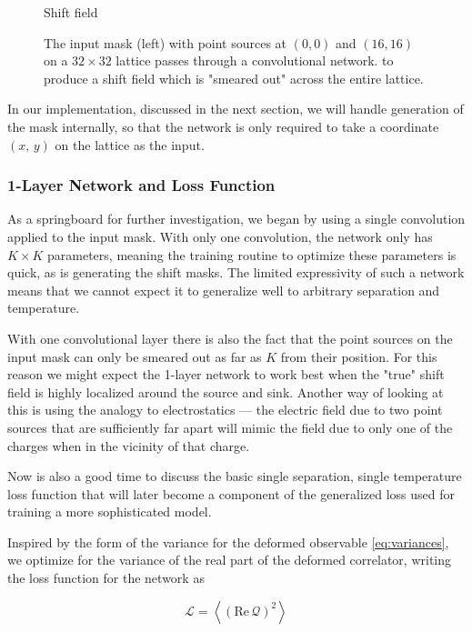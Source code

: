 \documentclass[12pt]{article}
\begin{document}
\begin{figure}[h]
\begin{minipage}{0.3\textwidth}
		\caption*{Shift field}
	\end{minipage}
	\caption{The input mask (left) with point sources at $(0,0)$ and $(16,16)$ on a $32\times 32$ lattice passes through a convolutional network. 
	to produce a shift field which is "smeared out" across the entire lattice.}
	\label{fig:mask_to_shift}
\end{figure}

In our implementation, discussed in the next section, we will handle generation of the mask internally, so that the network is only required to
take a coordinate $(x,\,y)$ on the lattice as the input. 

\subsubsection{1-Layer Network and Loss Function}

As a springboard for further investigation, we began by using a single convolution applied to the input mask. With only one convolution, the network
only has $K\times K$ parameters, meaning the training routine to optimize these parameters is quick, as is generating the shift masks. The limited
expressivity of such a network means that we cannot expect it to generalize well to arbitrary separation and temperature.

With one convolutional layer there is also the fact that the point sources on the input mask can only be smeared out as far as $K$ from their position.
For this reason we might expect the 1-layer network to work best when the "true" shift field is highly localized around the source and sink. Another way
of looking at this is using the analogy to electrostatics --- the electric field due to two point sources that are sufficiently far apart will mimic
the field due to only one of the charges when in the vicinity of that charge. 

Now is also a good time to discuss the basic single separation, single temperature loss function that will later become a component of the
generalized loss used for training a more sophisticated model. 

Inspired by the form of the variance for the deformed observable \ref{eq:variances}, we optimize for the variance of the real part of the 
deformed correlator, writing the loss function for the network as 

\begin{equation} \label{eq:loss}
	\mathcal{L} = \left\langle \left( \mathrm{Re}\, \mathcal{Q} \right)^2 \right\rangle
\end{equation}
\end{document}
